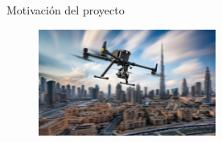 \documentclass[
  24pt, %
  aspectratio=169, %
]{beamer}
\begin{document}
\begin{frame}{Motivación del proyecto}
\begin{figure}[ht!]
\begin{minipage}{0.48\textwidth}
    \end{minipage}\hfill
    \begin{minipage}{0.48\textwidth}
      \centering
      \includegraphics[width=\linewidth,height=3.5cm]{drone_city.jpg} %
    \end{minipage}
  \end{figure}
\end{frame}
\end{document}
